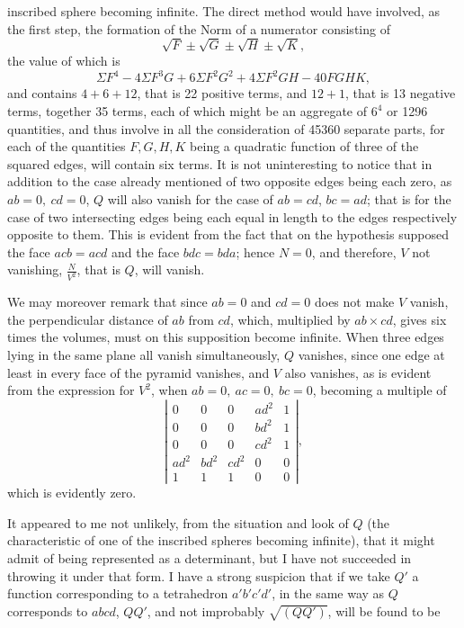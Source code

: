 \documentclass[11pt]{article}
\newcommand{\sourcepage}[1]{\marginpar{\scriptsize p.~#1}}
\begin{document}
{{\sourcepage{409}
inscribed sphere becoming infinite. The direct method would have involved, as the first step, the formation of the Norm of a numerator consisting of
\[
\sqrt F\pm\sqrt G\pm\sqrt H\pm\sqrt K,
\]
the value of which is
\[
\Sigma F^4-4\Sigma F^3G+6\Sigma F^2G^2+4\Sigma F^2GH-40FGHK,
\]
and contains $4+6+12$, that is 22 positive terms, and $12+1$, that is 13 negative terms, together 35 terms, each of which might be an aggregate of $6^4$ or 1296 quantities, and thus involve in all the consideration of 45360 separate parts, for each of the quantities $F,G,H,K$ being a quadratic function of three of the squared edges, will contain six terms. It is not uninteresting to notice that in addition to the case already mentioned of two opposite edges being each zero, as $ab=0,\ cd=0$, $Q$ will also vanish for the case of $ab=cd$, $bc=ad$; that is for the case of two intersecting edges being each equal in length to the edges respectively opposite to them. This is evident from the fact that on the hypothesis supposed the face $acb=acd$ and the face $bdc=bda$; hence $N=0$, and therefore, $V$ not vanishing, $\frac{N}{V^2}$, that is $Q$, will vanish.

We may moreover remark that since $ab=0$ and $cd=0$ does not make $V$ vanish, the perpendicular distance of $ab$ from $cd$, which, multiplied by $ab\times cd$, gives six times the volumes, must on this supposition become infinite. When three edges lying in the same plane all vanish simultaneously, $Q$ vanishes, since one edge at least in every face of the pyramid vanishes, and $V$ also vanishes, as is evident from the expression for $V^2$, when $ab=0,\ ac=0,\ bc=0$, becoming a multiple of
\[
\left|\begin{array}{ccccc}
0&0&0&ad^2&1\\
0&0&0&bd^2&1\\
0&0&0&cd^2&1\\
ad^2&bd^2&cd^2&0&0\\
1&1&1&0&0
\end{array}\right|,
\]
which is evidently zero.

It appeared to me not unlikely, from the situation and look of $Q$ (the characteristic of one of the inscribed spheres becoming infinite), that it might admit of being represented as a determinant, but I have not succeeded in throwing it under that form. I have a strong suspicion that if we take $Q'$ a function corresponding to a tetrahedron $a'b'c'd'$, in the same way as $Q$ corresponds to $abcd$, $QQ'$, and not improbably $\sqrt{(QQ')}$, will be found to be

}}
\end{document}
